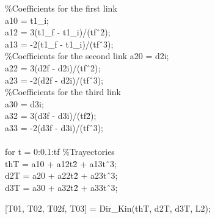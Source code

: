 \documentclass[12pt]{article}
\begin{document}
\%Coefficients for the first link
\\a10 = t1\_i;
\\a12 = 3\*(t1\_f - t1\_i)/(tf\^\ 2);
\\a13 = -2\*(t1\_f - t1\_i)/(tf\^\ 3);
\\
\%Coefficients for the second link
a20 = d2i;
\\a22 = 3\*(d2f - d2i)/(tf\^\ 2);
\\a23 = -2\*(d2f - d2i)/(tf\^\ 3);
\\
\%Coefficients for the third link
\\a30 = d3i;
\\a32 = 3\*(d3f - d3i)/(tf\^  2);
\\a33 = -2\*(d3f - d3i)/(tf\^\ 3);
\\
\\for t = 0:0.1:tf  
\%Trayectories
\\thT = a10 + a12\*t\^ 2 + a13\*t\^\ 3; 
\\d2T = a20 + a22\*t\^ 2 + a23\*t\^\ 3;
\\d3T = a30 + a32\*t\^ 2 + a33\*t\^\ 3;

[T01, T02, T02f, T03] = Dir\_Kin(thT, d2T, d3T, L2);
\end{document}

